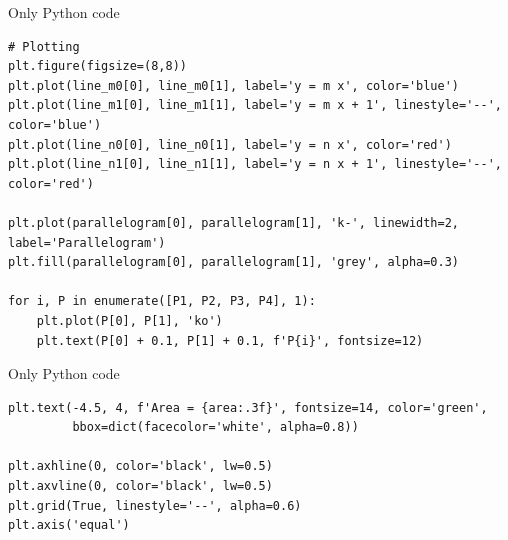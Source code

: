 \documentclass{beamer}
\begin{document}
\begin{frame}[fragile]{Only Python code}
\begin{lstlisting}
# Plotting
plt.figure(figsize=(8,8))
plt.plot(line_m0[0], line_m0[1], label='y = m x', color='blue')
plt.plot(line_m1[0], line_m1[1], label='y = m x + 1', linestyle='--', color='blue')
plt.plot(line_n0[0], line_n0[1], label='y = n x', color='red')
plt.plot(line_n1[0], line_n1[1], label='y = n x + 1', linestyle='--', color='red')

plt.plot(parallelogram[0], parallelogram[1], 'k-', linewidth=2, label='Parallelogram')
plt.fill(parallelogram[0], parallelogram[1], 'grey', alpha=0.3)

for i, P in enumerate([P1, P2, P3, P4], 1):
    plt.plot(P[0], P[1], 'ko')
    plt.text(P[0] + 0.1, P[1] + 0.1, f'P{i}', fontsize=12)
 \end{lstlisting}
 \end{frame}

\begin{frame}[fragile]{Only Python code}
\begin{lstlisting}
plt.text(-4.5, 4, f'Area = {area:.3f}', fontsize=14, color='green',
         bbox=dict(facecolor='white', alpha=0.8))

plt.axhline(0, color='black', lw=0.5)
plt.axvline(0, color='black', lw=0.5)
plt.grid(True, linestyle='--', alpha=0.6)
plt.axis('equal')
 \end{lstlisting}
 \end{frame}
\end{document}

